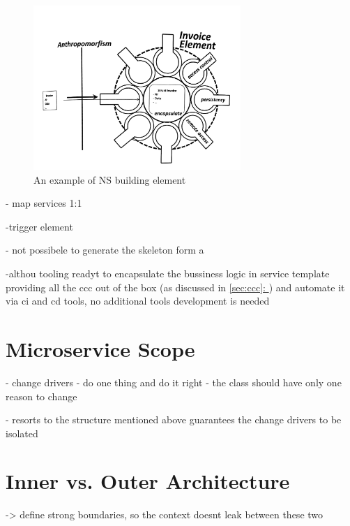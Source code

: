 \documentclass[thesis=M,english,hidelinks]{FITthesis}[2012/10/20]
\newcommand*{\fullref}[1]{\hyperref[{#1}]{\autoref*{#1}: \textit{\nameref*{#1}}}}
\begin{document}
\begin{figure}
  \centering
    \includegraphics[width=0.7\textwidth]{images/building_element.png}
    \caption{An example of \acrshort{NS} building element}
    \label{fig:ns-building-element}
\end{figure}

- map services 1:1

-trigger element\footnotemark


- not possibele to generate the skeleton form a 

-althou tooling readyt to encapsulate the bussiness logic in service template providing all the ccc out of the box (as discussed in \fullref{sec:ccc}) and automate it via ci and cd tools, no additional tools development is needed 



\section{Microservice Scope}
- change drivers
- do one thing and do it right
- the class should have only one reason to change

- resorts to the structure mentioned above guarantees the change drivers to be isolated


\section{Inner vs. Outer Architecture}
\label{sec:appl:inout}
-> define strong boundaries, so the context doesnt leak between these two
\end{document}
